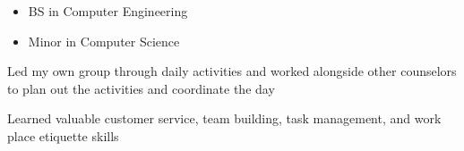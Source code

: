 \begin{itemize}
\item BS in Computer Engineering
\item Minor in Computer Science
\end{itemize}




Led my own group through daily activities and worked alongside other counselors to plan out the activities and coordinate the day

\divider

Learned valuable customer service, team building, task management, and work place etiquette skills


\clearpage

